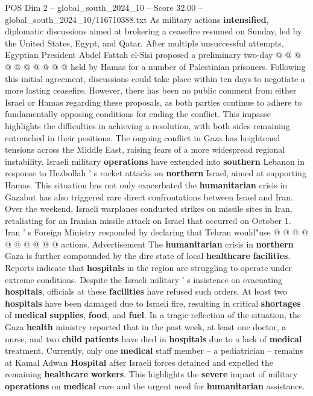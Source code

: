 \begin{textsample}{POS Dim 2 – global\_south\_2024\_10 – Score 32.00 – global\_south\_2024\_10/116710388.txt}
As military actions \textbf{intensified}, diplomatic discussions aimed at brokering a ceasefire resumed on Sunday, led by the United States, Egypt, and Qatar.
After multiple unsuccessful attempts, Egyptian President Abdel Fattah el-Sisi proposed a preliminary two-day @ @ @ @ @ @ @ @ @ @ held by Hamas for a number of Palestinian prisoners.
Following this initial agreement, discussions could take place within ten days to negotiate a more lasting ceasefire.
However, there has been no public comment from either Israel or Hamas regarding these proposals, as both parties continue to adhere to fundamentally opposing conditions for ending the conflict.
This impasse highlights the difficulties in achieving a resolution, with both sides remaining entrenched in their positions.
The ongoing conflict in Gaza has heightened tensions across the Middle East, raising fears of a more widespread regional instability.
Israeli military \textbf{operations} have extended into \textbf{southern} Lebanon in response to Hezbollah ' s rocket attacks on \textbf{northern} Israel, aimed at supporting Hamas.
This situation has not only exacerbated the \textbf{humanitarian} crisis in Gazabut has also triggered rare direct confrontations between Israel and Iran.
Over the weekend, Israeli warplanes conducted strikes on missile sites in Iran, retaliating for an Iranian missile attack on Israel that occurred on October 1.
Iran ' s Foreign Ministry responded by declaring that Tehran would"use @ @ @ @ @ @ @ @ @ @ actions.
Advertisement The \textbf{humanitarian} crisis in \textbf{northern} Gaza is further compounded by the dire state of local \textbf{healthcare} \textbf{facilities}.
Reports indicate that \textbf{hospitals} in the region are struggling to operate under extreme conditions.
Despite the Israeli military ' s insistence on evacuating \textbf{hospitals}, officials at these \textbf{facilities} have refused such orders.
At least two \textbf{hospitals} have been damaged due to Israeli fire, resulting in critical \textbf{shortages} of \textbf{medical} \textbf{supplies}, \textbf{food}, and \textbf{fuel}.
In a tragic reflection of the situation, the Gaza \textbf{health} ministry reported that in the past week, at least one doctor, a nurse, and two \textbf{child} \textbf{patients} have died in \textbf{hospitals} due to a lack of \textbf{medical} treatment.
Currently, only one \textbf{medical} staff member -- a pediatrician -- remains at Kamal Adwan \textbf{Hospital} after Israeli forces detained and expelled the remaining \textbf{healthcare} \textbf{workers}.
This highlights the \textbf{severe} impact of military \textbf{operations} on \textbf{medical} care and the urgent need for \textbf{humanitarian} assistance.

\end{textsample}
